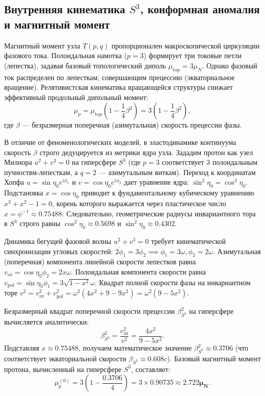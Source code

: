 \documentclass[11pt,a4paper]{article}
\begin{document}
\subsection{Внутренняя кинематика $S^3$, конформная аномалия и магнитный момент}
	Магнитный момент узла $T(p,q)$ пропорционален макроскопической циркуляции фазового тока. Полоидальная намотка ($p=3$) формирует три токовые петли (лепестка), задавая базовый топологический диполь $\mu_{\text{top}} = 3 \mu_N$. Однако фазовый ток распределен по лепесткам, совершающим прецессию (экваториальное вращение). Релятивистская кинематика вращающейся структуры снижает эффективный продольный дипольный момент:
	\begin{equation}
		\mu_p = \mu_{\text{top}} \left(1 - \frac{1}{4}\beta^2\right) = 3 \left(1 - \frac{1}{4}\beta^2\right),
	\end{equation}
	где $\beta$ — безразмерная поперечная (азимутальная) скорость прецессии фазы.
	
	В отличие от феноменологических моделей, в эластодинамике континуума скорость $\beta$ строго дедуцируется из метрики ядра узла. Зададим протон как узел Милнора $u^2 + v^3 = 0$ на гиперсфере $S^3$ (где $p=3$ соответствует 3 полоидальным пучностям-лепесткам, а $q=2$ — азимутальным виткам). 
	Переход к координатам Хопфа $u = \sin\eta_0 e^{i\phi_1}$ и $v = \cos\eta_0 e^{i\phi_2}$ дает уравнение ядра: $\sin^2\eta_0 = \cos^3\eta_0$. Подстановка $x = \cos\eta_0$ приводит к фундаментальному кубическому уравнению $x^3 + x^2 - 1 = 0$, корень которого выражается через пластическое число $x = \psi^{-1} \approx 0.75488$. Следовательно, геометрические радиусы инвариантного тора в $S^3$ строго равны $\cos^2\eta_0 \approx 0.5698$ и $\sin^2\eta_0 \approx 0.4302$.
	
	Динамика бегущей фазовой волны $u^2 + v^3 = 0$ требует кинематической синхронизации угловых скоростей: $2\dot{\phi}_1 = 3\dot{\phi}_2 \implies \dot{\phi}_1 = 3\omega, \dot{\phi}_2 = 2\omega$.
	Азимутальная (поперечная) компонента линейной скорости лепестков равна $v_{\text{az}} = \cos\eta_0 \dot{\phi}_2 = 2x\omega$.
	Полоидальная компонента скорости равна $v_{\text{pol}} = \sin\eta_0 \dot{\phi}_1 = 3\sqrt{1-x^2}\omega$.
	Квадрат полной скорости фазы на инвариантном торе $v^2 = v_{\text{az}}^2 + v_{\text{pol}}^2 = \omega^2 (4x^2 + 9 - 9x^2) = \omega^2 (9 - 5x^2)$.
	
	Безразмерный квадрат поперечной скорости прецессии $\beta_{S^3}^2$ на гиперсфере вычисляется аналитически:
	\begin{equation}
		\beta_{S^3}^2 = \frac{v_{\text{az}}^2}{v^2} = \frac{4x^2}{9 - 5x^2}.
	\end{equation}
	Подставляя $x \approx 0.75488$, получаем математическое значение $\beta_{S^3}^2 \approx 0.3706$ (что соответствует экваториальной скорости $\beta_{S^3} \approx 0.608 c$).
	Базовый магнитный момент протона, вычисленный на гиперсфере $S^3$, составляет:
	\begin{equation}
		\mu_p^{(0)} = 3 \left(1 - \frac{0.3706}{4}\right) = 3 \times 0.90735 \approx \mathbf{2.722 \mu_N}.
	\end{equation}
	
\end{document}
